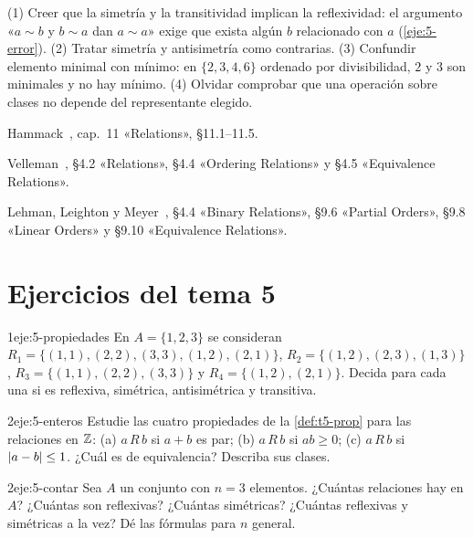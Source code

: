 \begin{observacion}
(1) Creer que la simetría y la transitividad implican la reflexividad: el argumento «$a\sim b$ y $b\sim a$ dan $a\sim a$» exige que exista algún $b$ relacionado con $a$ (\cref{eje:5-error}). (2) Tratar simetría y antisimetría como contrarias. (3) Confundir elemento minimal con mínimo: en $\{2,3,4,6\}$ ordenado por divisibilidad, $2$ y $3$ son minimales y no hay mínimo. (4) Olvidar comprobar que una operación sobre clases no depende del representante elegido.
\end{observacion}

\begin{lecturas}
\item Hammack~\cite{hammack}, cap.~11 «Relations», §11.1–11.5.
\item Velleman~\cite{velleman}, §4.2 «Relations», §4.4 «Ordering Relations» y §4.5 «Equivalence Relations».
\item Lehman, Leighton y Meyer~\cite{mcs}, §4.4 «Binary Relations», §9.6 «Partial Orders», §9.8 «Linear Orders» y §9.10 «Equivalence Relations».
\end{lecturas}

\section*{Ejercicios del tema 5}

\begin{ejercicio}{1}{eje:5-propiedades}
En $A=\{1,2,3\}$ se consideran $R_1=\{(1,1),(2,2),(3,3),(1,2),(2,1)\}$, $R_2=\{(1,2),(2,3),(1,3)\}$, $R_3=\{(1,1),(2,2),(3,3)\}$ y $R_4=\{(1,2),(2,1)\}$. Decida para cada una si es reflexiva, simétrica, antisimétrica y transitiva.
\end{ejercicio}

\begin{ejercicio}{2}{eje:5-enteros}
Estudie las cuatro propiedades de la \cref{def:t5-prop} para las relaciones en $\mathbb{Z}$: (a) $a\,R\,b$ si $a+b$ es par; (b) $a\,R\,b$ si $ab\ge0$; (c) $a\,R\,b$ si $\lvert a-b\rvert\le1$. ¿Cuál es de equivalencia? Describa sus clases.
\end{ejercicio}

\begin{ejercicio}{2}{eje:5-contar}
Sea $A$ un conjunto con $n=3$ elementos. ¿Cuántas relaciones hay en $A$? ¿Cuántas son reflexivas? ¿Cuántas simétricas? ¿Cuántas reflexivas y simétricas a la vez? Dé las fórmulas para $n$ general.
\end{ejercicio}

